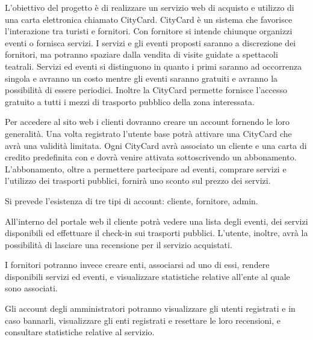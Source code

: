 L’obiettivo del progetto è di realizzare un servizio web di acquisto e utilizzo di una carta elettronica chiamato CityCard.
CityCard è un sistema che favorisce l’interazione tra turisti e fornitori. Con fornitore si intende chiunque organizzi eventi o fornisca servizi.
I servizi e gli eventi proposti saranno a discrezione dei fornitori, ma potranno spaziare dalla vendita di visite guidate a spettacoli teatrali. 
Servizi ed eventi si distinguono in quanto i primi saranno ad occorrenza singola e avranno un costo mentre gli eventi saranno gratuiti e avranno la possibilità di essere periodici.
Inoltre la CityCard permette fornisce l'accesso gratuito a tutti i mezzi di trasporto pubblico della zona interessata.

Per accedere al sito web i clienti dovranno creare un account fornendo le loro generalità. Una volta registrato l’utente base potrà attivare una CityCard che avrà una validità limitata. 
Ogni CityCard avrà associato un cliente e una carta di credito predefinita con e dovrà venire attivata sottoscrivendo un abbonamento. 
L'abbonamento, oltre a permettere partecipare ad eventi, comprare servizi e l'utilizzo dei trasporti pubblici, fornirà uno sconto sul prezzo dei servizi. 


Si prevede l'esistenza di tre tipi di account: cliente, fornitore, admin.

All’interno del portale web il cliente potrà vedere una lista degli eventi, dei servizi disponibili ed effettuare il check-in sui trasporti pubblici. 
L'utente, inoltre, avrà la possibilità di lasciare una recensione per il servizio acquistati.

I fornitori potranno invece creare enti, associarsi ad uno di essi, rendere disponibili servizi ed eventi, e visualizzare statistiche relative all'ente al quale sono associati.

Gli account degli amministratori potranno visualizzare gli utenti registrati e in caso bannarli, visualizzare gli enti registrati e resettare le loro recensioni, e consultare statistiche relative al servizio.